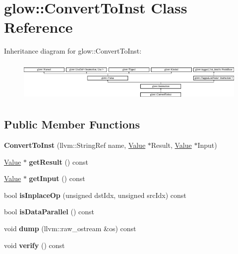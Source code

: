 \hypertarget{classglow_1_1_convert_to_inst}{}\section{glow\+:\+:Convert\+To\+Inst Class Reference}
\label{classglow_1_1_convert_to_inst}
Inheritance diagram for glow\+:\+:Convert\+To\+Inst\+:\begin{figure}[H]
\begin{center}
\leavevmode
\includegraphics[height=1.991111cm]{classglow_1_1_convert_to_inst}
\end{center}
\end{figure}
\subsection*{Public Member Functions}
\begin{DoxyCompactItemize}
\item 
\mbox{\label{classglow_1_1_convert_to_inst_a968d93ad122ad2d27e9505291799472e}} 
{\bfseries Convert\+To\+Inst} (llvm\+::\+String\+Ref name, \hyperlink{classglow_1_1_value}{Value} $\ast$Result, \hyperlink{classglow_1_1_value}{Value} $\ast$Input)
\item 
\mbox{\label{classglow_1_1_convert_to_inst_a408c6f0878e61c197f7c8577bbf60293}} 
\hyperlink{classglow_1_1_value}{Value} $\ast$ {\bfseries get\+Result} () const
\item 
\mbox{\label{classglow_1_1_convert_to_inst_a868ca5e055f4b6b1672c03a7818cd8d0}} 
\hyperlink{classglow_1_1_value}{Value} $\ast$ {\bfseries get\+Input} () const
\item 
\mbox{\label{classglow_1_1_convert_to_inst_a2b9e7fadffe731b47c960a3fbb502bad}} 
bool {\bfseries is\+Inplace\+Op} (unsigned dst\+Idx, unsigned src\+Idx) const
\item 
\mbox{\label{classglow_1_1_convert_to_inst_a3c92d1c7697a5b3a9a1a12a899207cc6}} 
bool {\bfseries is\+Data\+Parallel} () const
\item 
\mbox{\label{classglow_1_1_convert_to_inst_ae8c0f4359dc3d4599dab17b05f59b39f}} 
void {\bfseries dump} (llvm\+::raw\+\_\+ostream \&os) const
\item 
\mbox{\label{classglow_1_1_convert_to_inst_ab86887f907b49cc825c1f0c823da7a21}} 
void {\bfseries verify} () const
\end{DoxyCompactItemize}
